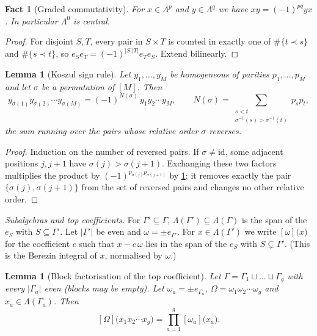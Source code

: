 \documentclass[11pt]{amsart}
\theoremstyle{plain}
\newtheorem{lemma}[theorem]{Lemma}
\newtheorem{fact}[theorem]{Fact}
\theoremstyle{definition}
\theoremstyle{remark}
\numberwithin{equation}{section}
\newcommand{\topc}[2]{[#1]\bigl(#2\bigr)}
\begin{document}
\begin{fact}[Graded commutativity]\label{fact:graded}
For $x\in\Lambda^p$ and $y\in\Lambda^q$ we have $xy=(-1)^{pq}yx$. In particular $\Lambda^0$ is
central.
\end{fact}

\begin{proof}
For disjoint $S,T$, every pair in $S\times T$ is counted in exactly one of $\#\{t\prec s\}$ and
$\#\{s\prec t\}$, so $e_Se_T=(-1)^{|S||T|}e_Te_S$. Extend bilinearly.
\end{proof}

\begin{lemma}[Koszul sign rule]\label{lem:koszul}
Let $y_1,\dots,y_M$ be homogeneous of parities $p_1,\dots,p_M$ and let $\sigma$ be a permutation
of $[M]$. Then
\[
  y_{\sigma(1)}y_{\sigma(2)}\cdots y_{\sigma(M)}=(-1)^{N(\sigma)}\,y_1y_2\cdots y_M,\qquad
  N(\sigma)=\sum_{\substack{s<t\\ \sigma^{-1}(s)>\sigma^{-1}(t)}}p_sp_t,
\]
the sum running over the pairs whose relative order $\sigma$ reverses.
\end{lemma}

\begin{proof}
Induction on the number of reversed pairs. If $\sigma\ne\mathrm{id}$, some adjacent positions
$j,j+1$ have $\sigma(j)>\sigma(j+1)$. Exchanging these two factors multiplies the product by
$(-1)^{p_{\sigma(j)}p_{\sigma(j+1)}}$ by \cref{fact:graded}; it removes exactly the pair
$\{\sigma(j),\sigma(j+1)\}$ from the set of reversed pairs and changes no other relative order.
\end{proof}

\emph{Subalgebras and top coefficients.} For $\Gamma'\subseteq\Gamma$, $\Lambda(\Gamma')\subseteq
\Lambda(\Gamma)$ is the span of the $e_S$ with $S\subseteq\Gamma'$. Let $|\Gamma'|$ be even and
$\omega=\pm e_{\Gamma'}$. For $x\in\Lambda(\Gamma')$ we write $\topc{\omega}{x}$ for the coefficient
$c$ such that $x-c\,\omega$ lies in the span of the $e_S$ with $S\subsetneq\Gamma'$. (This is the
Berezin integral of $x$, normalised by $\omega$.)

\begin{lemma}[Block factorisation of the top coefficient]\label{lem:block}
Let $\Gamma=\Gamma_1\sqcup\dots\sqcup\Gamma_g$ with every $|\Gamma_a|$ even (blocks may be empty).
Let $\omega_a=\pm e_{\Gamma_a}$, $\Omega=\omega_1\omega_2\cdots\omega_g$ and
$x_a\in\Lambda(\Gamma_a)$. Then
\[
  \topc{\Omega}{x_1x_2\cdots x_g}=\prod_{a=1}^{g}\topc{\omega_a}{x_a}.
\]
\end{lemma}
\end{document}
